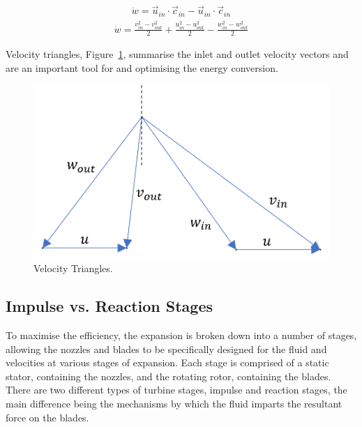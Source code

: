         \begin{align}
            \Dot{w} = \vec{u}_{in} \cdot \vec{c}_{in} - \vec{u}_{in}\cdot \vec{c}_{in} \label{eq:EulerEq}
        \end{align}
        \begin{align}
            \Dot{w} = \frac{v_{in}^2 - v_{out}^2}{2} + \frac{u_{in}^2-u_{out}^2}{2} - \frac{w_{in}^2-w_{out}^2}{2} \label{eq:AlternateEulerEq}
        \end{align}
    
        Velocity triangles, Figure~\ref{fig:prosim_litrev_velocity_triangles}, summarise the inlet and outlet velocity vectors and are an important tool for and optimising the  energy conversion.  
    
        \begin{figure}[H]
            \centering
            \includegraphics{Content/PowGen/Figures/Turbine/VelocityTriangles.png}
            \caption{Velocity Triangles.}
            \label{fig:prosim_litrev_velocity_triangles}
        \end{figure}
    
    \subsection{Impulse vs. Reaction Stages}
        To maximise the efficiency, the expansion is broken down into a number of stages, allowing the nozzles and blades to be specifically designed for the fluid and velocities at various stages of expansion. Each stage is comprised of a static stator, containing the nozzles, and the rotating rotor, containing the blades. There are two different types of turbine stages, impulse and reaction stages, the main difference being the mechanisms by which the fluid imparts the resultant force on the blades.
        
